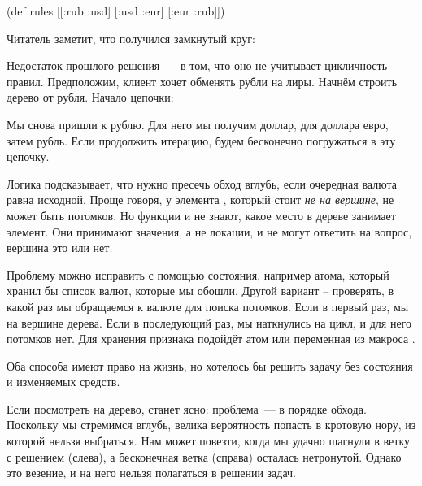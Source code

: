 \begin{english}
  \begin{clojure}
(def rules
  [[:rub :usd]
   [:usd :eur]
   [:eur :rub]])
  \end{clojure}
\end{english}

Читатель заметит, что получился замкнутый круг:

\begin{figure}[H]
  \centering
  
  \label{fig:chart-zip-18}
\end{figure}

Недостаток прошлого решения~--- в том, что оно не учитывает цикличность
правил. Предположим, клиент хочет обменять рубли на лиры. Начнём строить дерево
от рубля. Начало цепочки:

\begin{figure}[H]
  \centering
  
  \label{fig:chart-zip-19}
\end{figure}

Мы снова пришли к рублю. Для него мы получим доллар, для доллара евро, затем
рубль. Если продолжить итерацию, будем бесконечно погружаться в эту цепочку.

Логика подсказывает, что нужно пресечь обход вглубь, если очередная валюта равна
исходной. Проще говоря, у элемента , который стоит \emph{не на вершине}, не
может быть потомков. Но функции  и  не знают, какое
место в дереве занимает элемент. Они принимают значения, а не локации, и не
могут ответить на вопрос, вершина это или нет.


Проблему можно исправить с помощью состояния, например атома, который хранил бы
список валют, которые мы обошли. Другой вариант – проверять, в какой раз мы
обращаемся к валюте  для поиска потомков. Если в первый раз, мы на
вершине дерева. Если в последующий раз, мы наткнулись на цикл, и для него
потомков нет. Для хранения признака подойдёт атом или переменная из макроса
.

Оба способа имеют право на жизнь, но хотелось бы решить задачу без состояния и
изменяемых средств.

Если посмотреть на дерево, станет ясно: проблема~--- в порядке обхода. Поскольку
мы стремимся вглубь, велика вероятность попасть в кротовую нору, из которой
нельзя выбраться. Нам может повезти, когда мы удачно шагнули в ветку с решением
(слева), а бесконечная ветка (справа) осталась нетронутой. Однако это везение, и
на него нельзя полагаться в решении задач.

